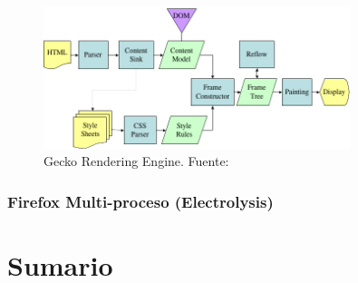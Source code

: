         \begin{figure}[h!t]
            \centering
            \includegraphics[width=0.8\textwidth]{figures/Gecko_Overview_9.png}
            \caption{Gecko Rendering Engine. Fuente: \cite{gecko}}
            \label{fig:Gecko}
        \end{figure}

        
    \subsubsection{Firefox Multi-proceso (Electrolysis)} 

            

\section{Sumario}
\label{chap3:Summ}




%     
%     







